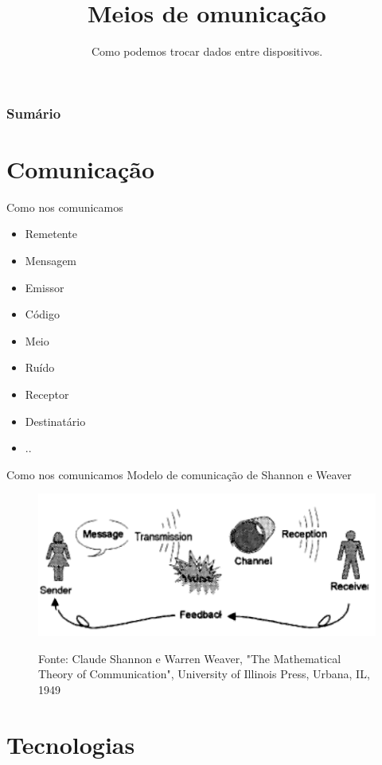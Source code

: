 \documentclass[t]{beamer}
\title{Meios de omunicação}
\subtitle{Como podemos trocar dados entre dispositivos.}
\begin{document}
\frame{\titlepage}

\begin{frame}
\frametitle{Sumário}
\tableofcontents
\end{frame}

\section{Comunicação}

\begin{frame}{Como nos comunicamos}
\begin{itemize}
	\item Remetente
	\item Mensagem
	\item Emissor
	\item Código
	\item Meio
	\item Ruído
	\item Receptor
	\item Destinatário
	\item ..
\end{itemize}
\end{frame}


\begin{frame}{Como nos comunicamos}
Modelo de comunicação de Shannon e Weaver
\begin{figure}
	\includegraphics[width=\linewidth]{Shannon-Weaver_model}
	
	\scriptsize Fonte: Claude Shannon e Warren Weaver, "The Mathematical Theory of Communication", University of Illinois Press, Urbana, IL, 1949
\end{figure}
\end{frame}

\section{Tecnologias}
\end{document}
